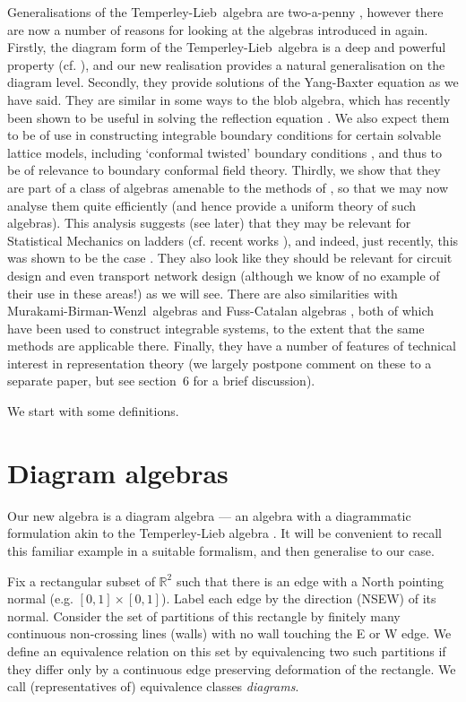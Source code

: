 \documentclass[12pt]{iopart}
\newcommand{\TL}{Temperley-Lieb}
\newcommand{\BMW}{Murakami-Birman-Wenzl}
\newcommand{\R}{\mathbb{R}}
\renewcommand{\paragraph}{\refstepcounter{paragraph}
\noindent {\bf (\theparagraph)}\indent}
\renewcommand{\theparagraph}{\arabic{section}.\arabic{paragraph}}
\begin{document}
Generalisations of the \TL\ algebra are two-a-penny
\cite{MS94a,MS94b, HCLee92,RuiXi,RGreen98}, however there are now a
number of reasons for looking at the algebras introduced in
\cite{GP93} again.  Firstly, the diagram form of the \TL\ algebra is a
deep and powerful property (cf. \cite{KS92a,KS92b,M91}), and our new
realisation provides a natural generalisation on the diagram level.
Secondly, they provide solutions of the Yang-Baxter equation as we
have said.  They are similar in some ways to the blob algebra, which
has recently been shown \cite{DM02} to be useful in solving the
reflection equation \cite{Sklyanin}.  We also expect them to be of use
in constructing integrable boundary conditions for certain solvable
lattice models, including `conformal twisted' boundary conditions
\cite{GS93,BP01,PZ01,G02,G03}, and thus to be of relevance to boundary
conformal field theory.  Thirdly, we show that they are part of a
class of algebras amenable to the methods of \cite{MS94b}, so that we
may now analyse them quite efficiently (and hence provide a uniform
theory of such algebras).  This analysis suggests (see later) that
they may be relevant for Statistical Mechanics on ladders (cf. recent
works \cite{WangSchlottmann,Wang,Tonel}), and indeed, just recently,
this was shown to be the case \cite{GB03}.  They also look like they
should be relevant for circuit design and even transport network
design (although we know of no example of their use in these areas!)
as we will see.  There are also similarities with \BMW\ algebras
\cite{M87,BW89} and Fuss-Catalan algebras \cite{DF98}, both of which
have been used to construct integrable systems, to the extent that the
same methods are applicable there.  Finally, they have a number of
features of technical interest in representation theory (we largely
postpone comment on these to a separate paper, but see section~6 for a
brief discussion).

We start with some definitions. 

\section{Diagram algebras}

Our new algebra is a diagram algebra --- an algebra with a
diagrammatic formulation akin to the Temperley-Lieb algebra
\cite{TL71,M91}.  It will be convenient to recall this familiar
example in a suitable formalism, and then generalise to our case.

\paragraph{}
Fix a rectangular subset of $\R^2$ such that there is an edge with a
North pointing normal (e.g. $[0,1]\times[0,1]$).  Label each edge by
the direction (NSEW) of its normal.  Consider the set of partitions of
this rectangle by finitely many continuous non-crossing lines (walls)
with no wall touching the E or W edge.  We define an equivalence
relation on this set by equivalencing two such partitions if they
differ only by a continuous edge preserving deformation of the
rectangle.  We call (representatives of) equivalence classes {\em
diagrams}.
\end{document}
